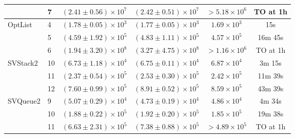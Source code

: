 \begin{table}[tbp]
\begin{tabular}{llcccc}
 & 7 & $(2.41 \pm 0.56) \times 10^{7}$ & $(2.42 \pm 0.51) \times 10^{7}$ & $>5.18 \times 10^{6}$ & TO at 1h  \\
\midrule
\multirow{3}{*}{OptList} & 4 & $(1.78 \pm 0.05) \times 10^{3}$ & $(1.77 \pm 0.05) \times 10^{3}$ & $1.69 \times 10^{3}$ & 15s \\
 & 5 & $(4.59 \pm 1.92) \times 10^{5}$ & $(4.83 \pm 1.11) \times 10^{5}$ & $4.57 \times 10^{5}$ & 16m 45s \\
 & 6 & $(1.94 \pm 3.20) \times 10^{8}$ & $(3.27 \pm 4.75) \times 10^{8}$ & $>1.16 \times 10^{6}$ & TO at 1h  \\
\midrule
\multirow{3}{*}{SVStack2} & 10 & $(6.73 \pm 1.18) \times 10^{4}$ & $(6.75 \pm 0.11) \times 10^{4}$ & $6.87 \times 10^{4}$ & 3m 15s \\
 & 11 & $(2.37 \pm 0.54) \times 10^{5}$ & $(2.53 \pm 0.30) \times 10^{5}$ & $2.42 \times 10^{5}$ & 11m 39s \\
 & 12 & $(7.60 \pm 0.99) \times 10^{5}$ & $(8.91 \pm 0.52) \times 10^{5}$ & $8.59 \times 10^{5}$ & 43m 39s \\
\midrule
\multirow{3}{*}{SVQueue2} & 9 & $(5.07 \pm 0.29) \times 10^{4}$ & $(4.73 \pm 0.19) \times 10^{4}$ & $4.86 \times 10^{4}$ & 4m 34s \\
 & 10 & $(1.88 \pm 0.22) \times 10^{5}$ & $(1.92 \pm 0.20) \times 10^{5}$ & $1.85 \times 10^{5}$ & 19m 38s \\
 & 11 & $(6.63 \pm 2.31) \times 10^{5}$ & $(7.38 \pm 0.88) \times 10^{5}$ & $>4.89 \times 10^{5}$ & TO at 1h  \\


\end{tabular}
\end{table}
